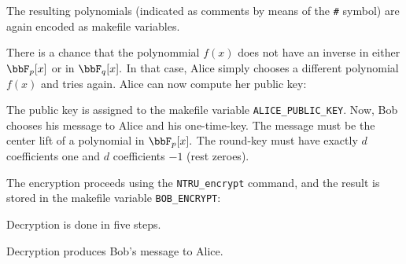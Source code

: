 
The resulting polynomials 
(indicated as comments by means of the  \verb'#' symbol) 
are again encoded as makefile variables. 


There is a chance that the polynommial 
$f(x)$ does not have an inverse in either $\bbF_p[x]$ 
or in $\bbF_q[x].$ 
In that case, Alice simply chooses a different 
polynomial $f(x)$ and tries again.
Alice can now compute her public key:




The public key is assigned to the makefile variable \verb'ALICE_PUBLIC_KEY'.
Now, Bob chooses his message to Alice and his one-time-key. 
The message must be the center lift of a polynomial in $\bbF_p[x].$
The round-key must have exactly $d$ coefficients one 
and $d$ coefficients $-1$ (rest zeroes).




The encryption proceeds using the \verb'NTRU_encrypt' command, 
and the result is stored in the makefile variable \verb'BOB_ENCRYPT':




Decryption is done in five steps. 

















Decryption produces Bob's message to Alice.

\bigskip





